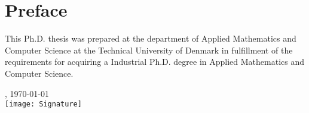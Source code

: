 \chapter{Preface}
This Ph.D. thesis was prepared at the department of Applied Mathematics and Computer Science at the Technical University of Denmark in fulfillment of the requirements for acquiring a Industrial Ph.D. degree in Applied Mathematics and Computer Science.

\vfill

{
\centering
    \thesislocation{}, \today\\[1cm]
    \hspace{3cm}\texttt{[image: Signature]}\\[1cm]
\begin{flushright}
    \thesisauthor{}
\end{flushright}
}